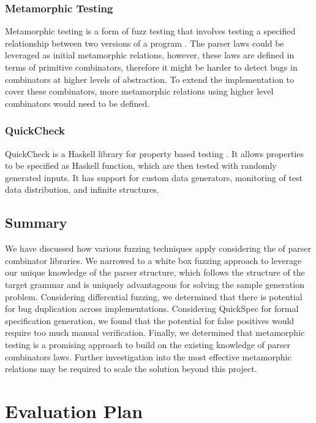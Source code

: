 \documentclass[11pt]{article}
\begin{document}
\subsubsection{Metamorphic Testing}

Metamorphic testing is a form of fuzz testing that involves testing a specified relationship between two versions of a program \cite{metamorphic}. The parser laws could be leveraged as initial metamorphic relations, however, these laws are defined in terms of primitive combinators, therefore it might be harder to detect bugs in combinators at higher levels of abstraction. To extend the implementation to cover these combinators, more metamorphic relations using higher level combinators would need to be defined.

\subsubsection{QuickCheck}

QuickCheck is a Haskell library for property based testing \cite{quickcheck}. It allows properties to be specified as Haskell function, which are then tested with randomly generated inputs. It has support for custom data generators, monitoring of test data distribution, and infinite structures. 

\subsection{Summary}

We have discussed how various fuzzing techniques apply considering the  of parser combinator libraries. We narrowed to a white box fuzzing approach to leverage our unique knowledge of the parser structure, which follows the structure of the target grammar and is uniquely advantageous for solving the sample generation problem. Considering differential fuzzing, we determined that there is potential for bug duplication across implementations. Considering QuickSpec for formal specification generation, we found that the potential for false positives would require too much manual verification. Finally, we determined that metamorphic testing is a promising approach to build on the existing knowledge of parser combinators laws. Further investigation into the most effective metamorphic relations may be required to scale the solution beyond this project.

\section{Evaluation Plan} %
\end{document}
